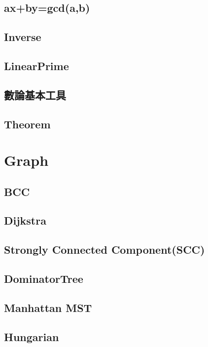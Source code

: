 \subsection{ax+by=gcd(a,b)}

\subsection{Inverse}

\subsection{LinearPrime}

\subsection{數論基本工具}
\subsection{Theorem}



\section{Graph}

\subsection{BCC}

\subsection{Dijkstra}

\subsection{Strongly Connected Component(SCC)}
\subsection{DominatorTree}


\subsection{Manhattan MST}

\subsection{Hungarian}

